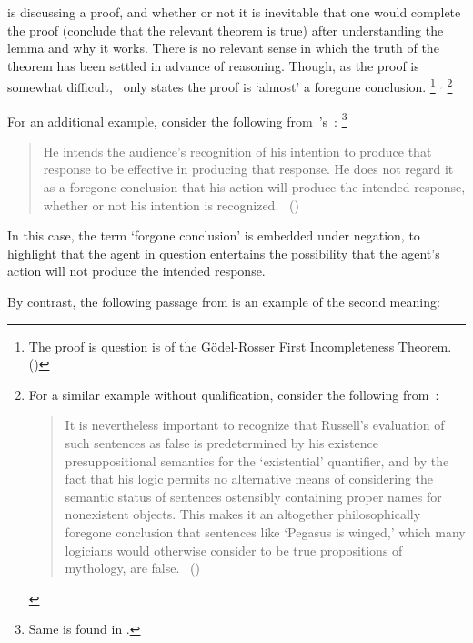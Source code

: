 \begin{note}
  \citeauthor{Machover:1996vu} is discussing a proof, and whether or not it is inevitable that one would complete the proof (conclude that the relevant theorem is true) after understanding the lemma and why it works.
  There is no relevant sense in which the truth of the theorem has been settled in advance of reasoning.
  Though, as the proof is somewhat difficult,~\citeauthor{Machover:1996vu} only states the proof is `almost' a foregone conclusion.%
  \footnote{
    The proof is question is of the G\"{o}del-Rosser First Incompleteness Theorem.
    (\citeyear[Cf.][226]{Machover:1996vu})
  }%
  \(^{,}\)
  \footnote{
    For a similar example without qualification, consider the following from~\textcite{Jacquette:2002up}:
    \begin{quote}
    It is nevertheless important to recognize that Russell’s evaluation of such sentences as false is predetermined by his existence presuppositional semantics for the ‘existential’ quantiﬁer, and by the fact that his logic permits no alternative means of considering the semantic status of sentences ostensibly containing proper names for nonexistent objects.
    This makes it an altogether philosophically foregone conclusion that sentences like ‘Pegasus is winged,’ which many logicians would otherwise consider to be true propositions of mythology, are false.%
    \mbox{ }\hfill\mbox{(\citeyear[6]{Jacquette:2002up})}
  \end{quote}
  }

  For an additional example, consider the following from~\citeauthor{Grice:1957vg}'s~:%
  \footnote{
    Same is found in \textcite[219]{Grice:1989uf}.
  }
  \begin{quote}
    He intends the audience's recognition of his intention to produce that response to be effective in producing that response.
    He does not regard it as a foregone conclusion that his action will produce the intended response, whether or not his intention is recognized.\newline
    \mbox{ }\hfill\mbox{(\citeyear[385]{Grice:1957vg})}
  \end{quote}

  In this case, the term `forgone conclusion' is embedded under negation, to highlight that the agent in question entertains the possibility that the agent's action will not produce the intended response.

  By contrast, the following passage from \textcite{Kadane:1996vu} is an example of the second meaning:


\end{note}
